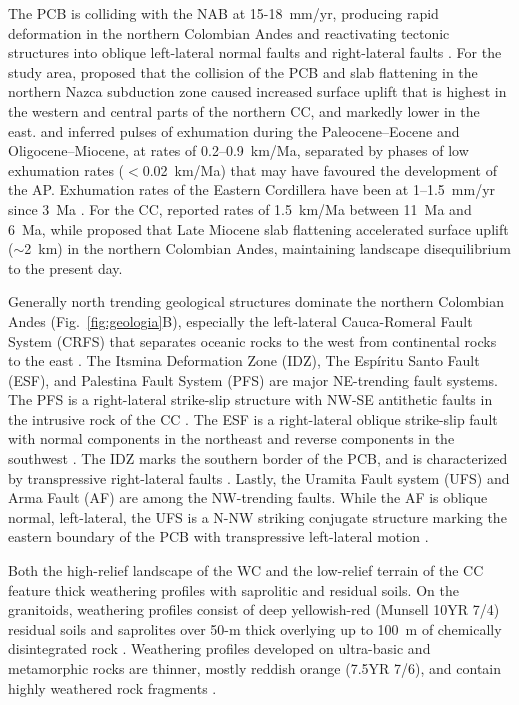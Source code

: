 \documentclass[draft]{agujournal2019}
\begin{document}
\par The PCB is colliding with the NAB at 15-18~mm/yr, producing rapid deformation in the northern Colombian Andes \cite{kellogg2019} and reactivating tectonic structures into oblique left-lateral normal faults and right-lateral faults \cite{acosta2007}. For the study area,  proposed that the collision of the PCB and slab flattening in the northern Nazca subduction zone caused increased surface uplift that is highest in the western and central parts of the northern CC, and markedly lower in the east.  and  inferred pulses of exhumation during the Paleocene–Eocene and Oligocene–Miocene, at rates of 0.2–0.9~km/Ma, separated by phases of low exhumation rates ($<$0.02~km/Ma) that may have favoured the development of the AP. Exhumation rates of the Eastern Cordillera have been at 1–1.5~mm/yr since 3~Ma \cite{mora2010}. For the CC,  reported rates of 1.5~km/Ma between 11~Ma and 6~Ma, while  proposed that Late Miocene slab ﬂattening accelerated surface uplift ($\sim$2~km) in the northern Colombian Andes, maintaining landscape disequilibrium to the present day.

\par Generally north trending geological structures dominate the northern Colombian Andes (Fig.~\ref{fig:geologia}B), especially the left-lateral Cauca-Romeral Fault System (CRFS) that separates oceanic rocks to the west from continental rocks to the east \cite{Egholm2013, ego1995}. The Itsmina Deformation Zone (IDZ), The Espíritu Santo Fault (ESF), and Palestina Fault System (PFS) are major NE-trending fault systems. The PFS is a right-lateral strike-slip structure with NW-SE antithetic faults in the intrusive rock of the CC \cite{acosta2007, feininger1970}. The ESF is a right-lateral oblique strike-slip fault with normal components in the northeast and reverse components in the southwest \cite{Noriega2020, page1986}. The IDZ marks the southern border of the PCB, and is characterized by transpressive right-lateral faults \cite{acosta2007, Taboada2000}. Lastly, the Uramita Fault system (UFS) and Arma Fault (AF) are among the NW-trending faults. While the AF is oblique normal, left-lateral, the UFS is a N-NW striking conjugate structure marking the eastern boundary of the PCB with transpressive left-lateral motion \cite{acosta2007, Taboada2000}.

\par Both the high-relief landscape of the WC and the low-relief terrain of the CC feature thick weathering profiles with saprolitic and residual soils. On the granitoids, weathering profiles consist of deep yellowish-red (Munsell 10YR 7/4) residual soils and saprolites over 50-m thick overlying up to 100~m of chemically disintegrated rock \cite{aristizabal2005tropical}. Weathering profiles developed on ultra-basic and metamorphic rocks are thinner, mostly reddish orange (7.5YR 7/6), and contain highly weathered rock fragments \cite{aristizabal2005tropical}.
\end{document}
